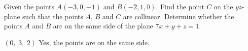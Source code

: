 
\begin{Exercise}[
name={},
title={}, 
difficulty=0,
origin={\cite{BS}}]
Given the points $A(-3, 0, -1)$ and $B(-2, 1, 0)$.
\Question Find the point $C$ on the $yz$-plane such that the points $A$, $B$ and $C$ are collinear.
\Question Determine whether the points $A$ and $B$ are on the same side of the plane $7x+y+z=1$.

\end{Exercise}
\begin{Answer}
\Question $(0,\;3,\;2)$
\Question Yes, the points are on the same side.
\end{Answer}
